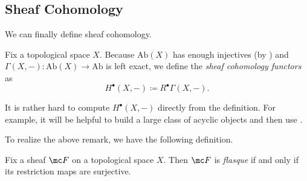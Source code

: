 \documentclass[../notes.tex]{subfiles}
\begin{document}
\subsection{Sheaf Cohomology}
We can finally define sheaf cohomology.
\begin{definition}
	Fix a topological space $X$. Because $\mathrm{Ab}(X)$ has enough injectives (by ) and $\Gamma(X,-)\colon\mathrm{Ab}(X)\to\mathrm{Ab}$ is left exact, we define the \textit{sheaf cohomology functors} as
	\[H^\bullet(X,-)\coloneqq R^\bullet\Gamma(X,-).\]
\end{definition}
\begin{remark}
	It is rather hard to compute $H^\bullet(X,-)$ directly from the definition. For example, it will be helpful to build a large class of acyclic objects and then use .
\end{remark}
To realize the above remark, we have the following definition.
\begin{definition}[flasque]
	Fix a sheaf $\mc F$ on a topological space $X$. Then $\mc F$ is \textit{flasque} if and only if its restriction maps are surjective.
\end{definition}
\end{document}
